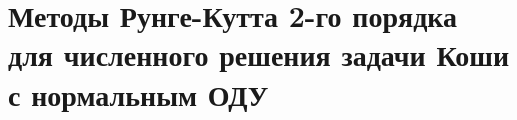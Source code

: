 \documentclass[__main__.tex]{subfiles}
\begin{document}
\section{Методы Рунге-Кутта 2-го порядка для численного решения задачи Коши с нормальным ОДУ}
\end{document}
